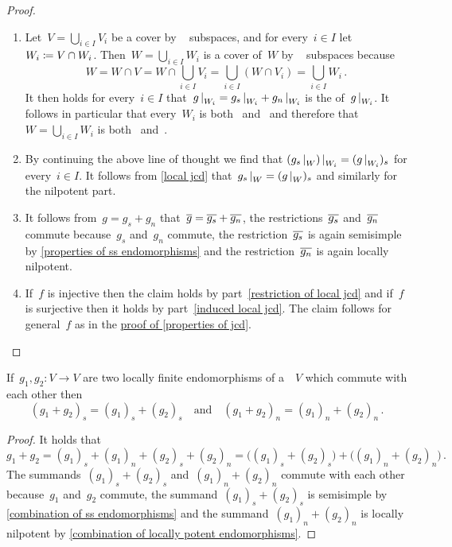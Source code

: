 \begin{proof}
  \leavevmode
  \begin{enumerate}
    \item
      Let~$V = \bigcup_{i \in I} V_i$ be a cover by {\fd}~ subspaces, and for every~$i \in I$ let~$W_i \coloneqq V \cap W_i$.
      Then~$W = \bigcup_{i \in I} W_i$ is a cover of~$W$ by {\fd}~ subspaces because
      \[
          W 
        = W \cap V
        = W \cap \bigcup_{i \in I} V_i
        = \bigcup_{i \in I} (W \cap V_i)
        = \bigcup_{i \in I} W_i \,.
      \]
      It then holds for every~$i \in I$ that~$\restrict{g}{W_i} = \restrict{g_s}{W_i} + \restrict{g_n}{W_i}$ is the {\JCD} of~$\restrict{g}{W_i}$.
      It follows in particular that every~$W_i$ is both~ and~ and therefore that~$W = \bigcup_{i \in I} W_i$ is both~ and~.
    \item
      By continuing the above line of thought we find that $\restrict{(\restrict{g_s}{W})}{W_i} = (\restrict{g}{W_i})_s$ for every~$i \in I$.
      It follows from \cref{local jcd} that~$\restrict{g_s}{W} = ( \restrict{g}{W} )_s$ and similarly for the nilpotent part.
    \item
      It follows from~$g = g_s + g_n$ that~$\overline{g} = \overline{g_s} + \overline{g_n}$, the restrictions~$\overline{g_s}$ and~$\overline{g_n}$ commute because~$g_s$ and~$g_n$ commute, the restriction~$\overline{g_s}$ is again semisimple by \cref{properties of ss endomorphisms} and the restriction~$\overline{g_n}$ is again locally nilpotent.
    \item
      If~$f$ is injective then the claim holds by part~\ref*{restriction of local jcd} and if~$f$ is surjective then it holds by part~\ref*{induced local jcd}.
      The claim follows for general~$f$ as in the \hyperref[properties of jcd proof]{proof of \cref{properties of jcd}}.
    \qedhere
  \end{enumerate}
\end{proof}


\begin{lemma}
  If~$g_1, g_2 \colon V \to V$ are two locally finite endomorphisms of a~{\kvs}~$V$ which commute with each other then
  \[
      (g_1 + g_2)_s
    = (g_1)_s + (g_2)_s
    \quad\text{and}\quad
      (g_1 + g_2)_n
    = (g_1)_n + (g_2)_n \,.
  \]
\end{lemma}


\begin{proof}
  It holds that
  \[
      g_1 + g_2
    = (g_1)_s + (g_1)_n + (g_2)_s + (g_2)_n
    = \bigl( (g_1)_s + (g_2)_s \bigr) + \bigl( (g_1)_n + (g_2)_n \bigr) \,.
  \]
  The summands~$(g_1)_s + (g_2)_s$ and~$(g_1)_n + (g_2)_n$ commute with each other because~$g_1$ and~$g_2$ commute, the summand~$(g_1)_s + (g_2)_s$ is semisimple by \cref{combination of ss endomorphisms} and the summand~$(g_1)_n + (g_2)_n$ is locally nilpotent by \cref{combination of locally potent endomorphisms}.
\end{proof}





